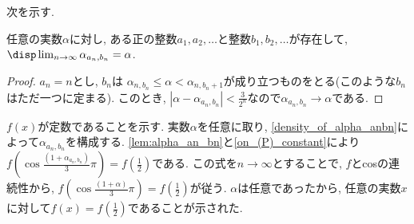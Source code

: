次を示す.
\begin{lem}[稠密性] \label{density_of_alpha_anbn}
任意の実数$\alpha$に対し, ある正の整数$a_1,a_2,\dots$と整数$b_1,b_2,\dots$が存在して, $\disp\lim_{n\to \infty}\alpha_{a_n, b_n} = \alpha$.
\end{lem}

\begin{proof}
$a_n = n$とし, $b_n$は $\alpha_{n,b_n} \leq \alpha < \alpha_{n,b_n + 1}$が成り立つものをとる(このような$b_n$はただ一つに定まる). このとき, $|\alpha - \alpha_{a_n,b_n}| < \frac{3}{2^n}$なので$\alpha_{a_n,b_n}\to \alpha$である.
\end{proof}

$f(x)$が定数であることを示す. 実数$\alpha$を任意に取り, \cref{density_of_alpha_anbn}によって$\alpha_{a_n,b_n}$を構成する.
\cref{lem:alpha_an_bn}と\cref{on_(P)_constant}により$f(\cos{\frac{(1+\alpha_{a_n,b_n})}{3}\pi}) = f(\frac{1}{2})$である.
この式を$n \to \infty$とすることで, $f$とcosの連続性から, $f(\cos{\frac{(1+\alpha)}{3}\pi}) = f(\frac{1}{2})$が従う.
 $\alpha$は任意であったから, 任意の実数$x$に対して$f(x) = f(\frac{1}{2})$であることが示された.
